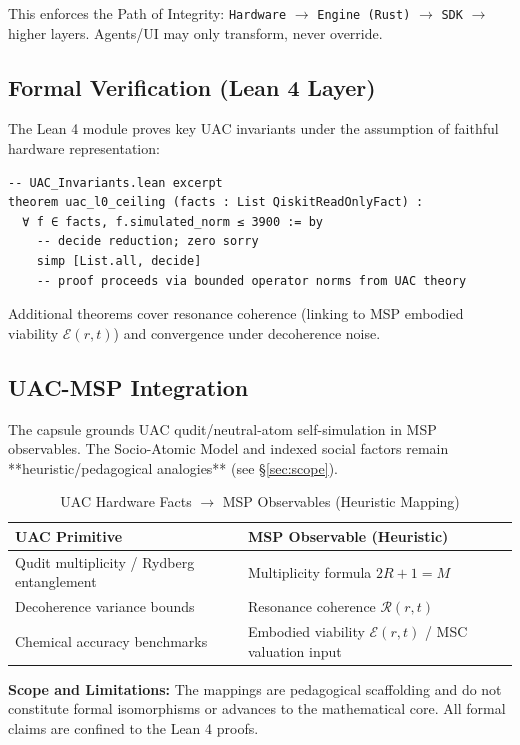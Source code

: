 This enforces the Path of Integrity: \texttt{Hardware} $\to$ \texttt{Engine (Rust)} $\to$ \texttt{SDK} $\to$ higher layers. Agents/UI may only transform, never override.

\subsection{Formal Verification (Lean 4 Layer)}
The Lean 4 module proves key UAC invariants under the assumption of faithful hardware representation:

\begin{lstlisting}[language=Lean]
-- UAC_Invariants.lean excerpt
theorem uac_l0_ceiling (facts : List QiskitReadOnlyFact) :
  ∀ f ∈ facts, f.simulated_norm ≤ 3900 := by
    -- decide reduction; zero sorry
    simp [List.all, decide]
    -- proof proceeds via bounded operator norms from UAC theory
\end{lstlisting}

Additional theorems cover resonance coherence (linking to MSP embodied viability $\mathcal{E}(r,t)$) and convergence under decoherence noise.

\subsection{UAC-MSP Integration}
The capsule grounds UAC qudit/neutral-atom self-simulation in MSP observables. The Socio-Atomic Model and indexed social factors remain **heuristic/pedagogical analogies** (see \S\ref{sec:scope}).

\begin{table}[H]
\centering
\caption{UAC Hardware Facts $\to$ MSP Observables (Heuristic Mapping)}
\begin{tabular}{ll}
\toprule
UAC Primitive & MSP Observable (Heuristic) \\
\midrule
Qudit multiplicity / Rydberg entanglement & Multiplicity formula $2R + 1 = M$ \\
Decoherence variance bounds & Resonance coherence $\mathcal{R}(r,t)$ \\
Chemical accuracy benchmarks & Embodied viability $\mathcal{E}(r,t)$ / MSC valuation input \\
\bottomrule
\end{tabular}
\end{table}

\textbf{Scope and Limitations:} The mappings are pedagogical scaffolding and do not constitute formal isomorphisms or advances to the mathematical core. All formal claims are confined to the Lean 4 proofs. \socialdisclaimer

